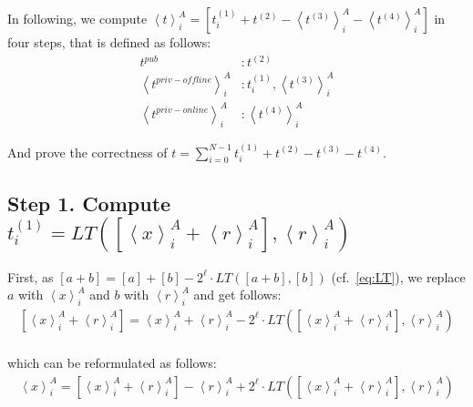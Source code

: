 In following, we compute $\left\langle t\right\rangle^A_i =\left[t^{(1)}_i+t^{\left(2\right) }-\left\langle t^{(3)}\right\rangle^A_i-\left\langle t^{(4)}\right\rangle^A_i \right] $ in four steps, that is defined as follows:
\begin{equation}
    \begin{split}
        t^{pub}&: t^{(2)} \\
        \left\langle t^{priv-offline}\right\rangle ^A_i&: t^{(1)}_i,\left\langle t^{(3)}\right\rangle^A_i \\
        \left\langle t^{priv-online}\right\rangle ^A_i&: \left\langle t^{(4)}\right\rangle^A_i
    \end{split}
\end{equation}

And prove the correctness of $t=\sum_{i=0}^{N-1} t^{(1)}_i+t^{(2)}  -  t^{\left(3\right)} -t^{\left(4\right) } $.

\subsection{Step 1. Compute $t^{(1)}_i=LT\left(\left[\left\langle x\right\rangle_i^A + \left\langle r\right\rangle^A_i\right] ,\left\langle r\right\rangle^A_i \right)$}
\label{wrap:step1}

First, as $ \left[a +b\right]  =\left[a\right]  + \left[b\right] -2^{\ell} \cdot LT\left(\left[a+b\right] ,\left[b\right] \right) $ (cf.~\autoref{eq:LT}), we replace $a$ with $\left\langle x\right\rangle_i^A$ and $b$ with $\left\langle r\right\rangle_i^A$ and get follows:
\begin{equation}
    \begin{split}
        \left[\left\langle x\right\rangle_i^A + \left\langle r\right\rangle^A_i\right] =\left\langle x\right\rangle_i^A + \left\langle r\right\rangle^A_i-2^{\ell}\cdot LT\left(\left[\left\langle x\right\rangle_i^A + \left\langle r\right\rangle^A_i\right] ,\left\langle r\right\rangle^A_i \right)\\
    \end{split}
\end{equation}

which can be reformulated as follows:
\begin{equation}
    \label{eq:LT2}
    \begin{split}
        \left\langle x\right\rangle_i^A=\left[\left\langle x\right\rangle_i^A + \left\langle r\right\rangle^A_i\right] -\left\langle r\right\rangle^A_i+2^{\ell}\cdot LT\left(\left[\left\langle x\right\rangle_i^A + \left\langle r\right\rangle^A_i\right] ,\left\langle r\right\rangle^A_i \right)
    \end{split}
\end{equation}


